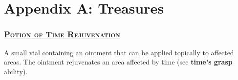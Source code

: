 \section{Appendix A: Treasures}

\subsubsection*{\underline{\textsc{\Large Potion of Time Rejuvenation}}}
A small vial containing an ointment that can be applied topically to affected areas. The ointment rejuvenates an area affected by time (see \textbf{time's grasp} ability).
